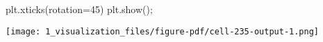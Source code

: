 \documentclass[
  letterpaper,
  DIV=11,
  numbers=noendperiod]{scrartcl}
\newenvironment{Shaded}{\begin{snugshade}}{\end{snugshade}}
\newcommand{\DecValTok}[1]{\textcolor[rgb]{0.68,0.00,0.00}{#1}}
\newcommand{\NormalTok}[1]{\textcolor[rgb]{0.00,0.23,0.31}{#1}}
\newcommand{\OperatorTok}[1]{\textcolor[rgb]{0.37,0.37,0.37}{#1}}
\begin{document}
\begin{Shaded}
\begin{Highlighting}[]
\NormalTok{plt.xticks(rotation}\OperatorTok{=}\DecValTok{45}\NormalTok{)}
\NormalTok{plt.show()}\OperatorTok{;}
\end{Highlighting}
\end{Shaded}

\texttt{[image: 1\_visualization\_files/figure-pdf/cell-235-output-1.png]}
\end{document}
